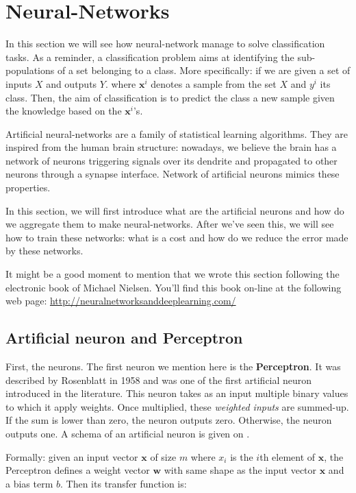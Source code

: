 
\chapter{Neural-Networks}
\label{sec:neural_networks}

	In this section we will see how neural-network manage to solve classification tasks. As a reminder, a classification problem aims at identifying the sub-populations of a set belonging to a class. More specifically: if we are given a set of inputs $X$ and outputs $Y$. where $\boldsymbol{x}^i$ denotes a sample from the set $X$ and $y^i$ its class. Then, the aim of classification is to predict the class a new sample given the knowledge based on the $\boldsymbol{x}^i$'s.

	Artificial neural-networks are a family of statistical learning algorithms. They are inspired from the human brain structure: nowadays, we believe the brain has a network of neurons triggering signals over its dendrite and propagated to other neurons through a synapse interface. Network of artificial neurons mimics these properties.

	In this section, we will first introduce what are the artificial neurons and how do we aggregate them to make neural-networks. After we've seen this, we will see how to train these networks: what is a cost and how do we reduce the error made by these networks.

	It might be a good moment to mention that we wrote this section following the electronic book of Michael Nielsen. You'll find this book on-line at the following web page: \url{http://neuralnetworksanddeeplearning.com/}


	\section{Artificial neuron and Perceptron}
	\label{sec:Artificial_neurons}
		First, the neurons. The first neuron we mention here is the \textbf{Perceptron}. It was described by Rosenblatt in 1958 \cite{rosenblatt1958perceptron} and was one of the first artificial neuron introduced in the literature. This neuron takes as an input multiple binary values to which it apply weights. Once multiplied, these \textit{weighted inputs} are summed-up. If the sum is lower than zero, the neuron outputs zero. Otherwise, the neuron outputs one. A schema of an artificial neuron is given on .

		Formally: given an input vector $\boldsymbol{x}$ of size $m$ where $x_i$ is the $i$th element of $\boldsymbol{x}$, the Perceptron defines a weight vector $\boldsymbol{w}$ with same shape as the input vector $\boldsymbol{x}$ and a bias term $b$. Then its transfer function is:

